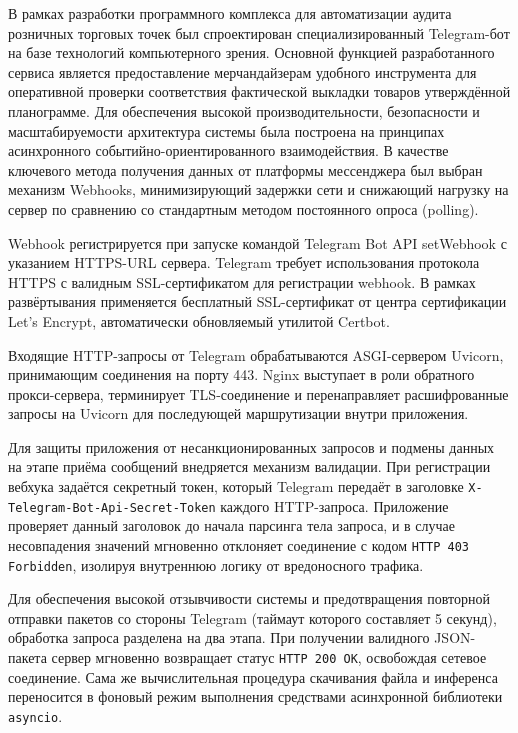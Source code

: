 {	\par \redline В рамках разработки программного комплекса для автоматизации аудита розничных торговых точек был спроектирован 
	специализированный Telegram-бот на базе технологий компьютерного зрения.
	Основной функцией разработанного сервиса является 
	предоставление мерчандайзерам удобного инструмента для оперативной проверки соответствия фактической выкладки товаров утверждённой 
	планограмме.
	Для обеспечения высокой производительности, безопасности и масштабируемости архитектура системы была построена на принципах 
	асинхронного событийно-ориентированного взаимодействия.
	В качестве ключевого метода получения данных от платформы мессенджера был выбран 
	механизм Webhooks, минимизирующий задержки сети и снижающий нагрузку на сервер по сравнению со стандартным методом постоянного 
	опроса (polling).
	\par \redline Webhook регистрируется при запуске командой Telegram Bot API setWebhook с указанием HTTPS-URL сервера.
	Telegram требует использования протокола HTTPS с валидным SSL-сертификатом для регистрации webhook.
	В рамках развёртывания применяется 
	бесплатный SSL-сертификат от центра сертификации Let's Encrypt, автоматически обновляемый утилитой Certbot.
	\par \redline Входящие HTTP-запросы от Telegram обрабатываются ASGI-сервером Uvicorn, принимающим соединения на порту 443. 
	Nginx выступает в роли обратного прокси-сервера, терминирует TLS-соединение и перенаправляет расшифрованные запросы на Uvicorn для 
	последующей маршрутизации внутри приложения.
	\par \redline Для защиты приложения от несанкционированных запросов и подмены данных на 
	этапе приёма сообщений внедряется механизм валидации.
	При регистрации вебхука задаётся секретный токен, который Telegram передаёт в 
	заголовке \texttt{X-Telegram-Bot-Api-Secret-Token} каждого HTTP-запроса.
	Приложение проверяет данный заголовок до начала парсинга 
	тела запроса, и в случае несовпадения значений мгновенно отклоняет соединение с кодом \texttt{HTTP 403 Forbidden}, изолируя внутреннюю 
	логику от вредоносного трафика.
	\par \redline Для обеспечения высокой отзывчивости системы и предотвращения повторной отправки пакетов 
	со стороны Telegram (таймаут которого составляет 5 секунд), обработка запроса разделена на два этапа.
	При получении валидного JSON-пакета 
	сервер мгновенно возвращает статус \texttt{HTTP 200 OK}, освобождая сетевое соединение.
	Сама же вычислительная процедура скачивания файла 
	и инференса переносится в фоновый режим выполнения средствами асинхронной библиотеки \texttt{asyncio}.
}
